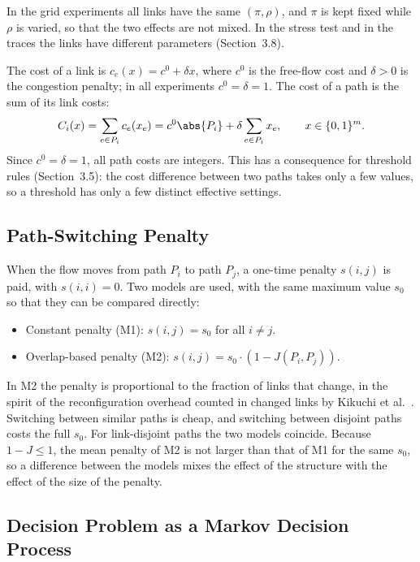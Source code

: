 In the grid experiments all links have the same $(\pi, \rho)$, and $\pi$ is kept fixed while $\rho$ is varied, so that the two effects are not mixed. In the stress test and in the traces the links have different parameters (Section~3.8).

The cost of a link is $c_e(x) = c^0 + \delta x$, where $c^0$ is the free-flow cost and $\delta > 0$ is the congestion penalty; in all experiments $c^0 = \delta = 1$. The cost of a path is the sum of its link costs:
\begin{equation}
  C_i(x) = \sum_{e \in P_i} c_e(x_e) = c^0 \abs{P_i} + \delta \sum_{e \in P_i} x_e, \qquad x \in \{0,1\}^m.
  \label{eq:pathcost}
\end{equation}
Since $c^0 = \delta = 1$, all path costs are integers. This has a consequence for threshold rules (Section~3.5): the cost difference between two paths takes only a few values, so a threshold has only a few distinct effective settings.

\subsection{Path-Switching Penalty}

When the flow moves from path $P_i$ to path $P_j$, a one-time penalty $s(i,j)$ is paid, with $s(i,i) = 0$. Two models are used, with the same maximum value $s_0$ so that they can be compared directly:
\begin{itemize}
  \item Constant penalty (M1): $s(i,j) = s_0$ for all $i \neq j$.
  \item Overlap-based penalty (M2): $s(i,j) = s_0 \cdot (1 - J(P_i, P_j))$.
\end{itemize}
In M2 the penalty is proportional to the fraction of links that change, in the spirit of the reconfiguration overhead counted in changed links by Kikuchi et al.\ \cite{kikuchi2025}. Switching between similar paths is cheap, and switching between disjoint paths costs the full $s_0$. For link-disjoint paths the two models coincide. Because $1 - J \le 1$, the mean penalty of M2 is not larger than that of M1 for the same $s_0$, so a difference between the models mixes the effect of the structure with the effect of the size of the penalty.

\subsection{Decision Problem as a Markov Decision Process}

